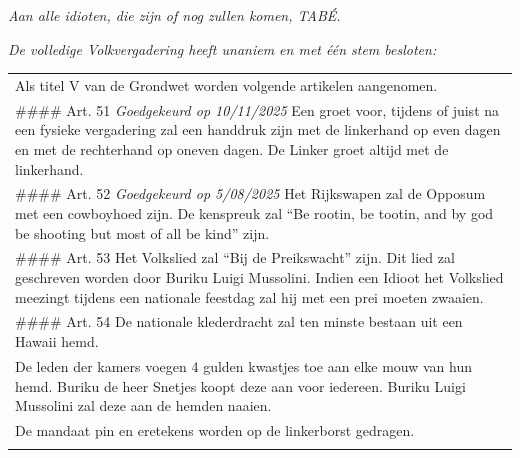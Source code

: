 \emph{Aan alle idioten, die zijn of nog zullen komen, TABÉ.}

\emph{De volledige Volkvergadering heeft unaniem en met één stem
besloten:}

\begin{longtable}[]{@{}l@{}}
\toprule
\endhead
\begin{minipage}[t]{0.36\columnwidth}\raggedright
Als titel V van de Grondwet worden volgende artikelen aangenomen.\strut
\end{minipage}\tabularnewline
\begin{minipage}[t]{0.36\columnwidth}\raggedright
\#\#\#\# Art. 51 \emph{Goedgekeurd op 10/11/2025} Een groet voor,
tijdens of juist na een fysieke vergadering zal een handdruk zijn met de
linkerhand op even dagen en met de rechterhand op oneven dagen. De
Linker groet altijd met de linkerhand.\strut
\end{minipage}\tabularnewline
\begin{minipage}[t]{0.36\columnwidth}\raggedright
\#\#\#\# Art. 52 \emph{Goedgekeurd op 5/08/2025} Het Rijkswapen zal de
Opposum met een cowboyhoed zijn. De kenspreuk zal ``Be rootin, be
tootin, and by god be shooting but most of all be kind'' zijn.\strut
\end{minipage}\tabularnewline
\begin{minipage}[t]{0.36\columnwidth}\raggedright
\#\#\#\# Art. 53 Het Volkslied zal ``Bij de Preikswacht'' zijn. Dit lied
zal geschreven worden door Buriku Luigi Mussolini. Indien een Idioot het
Volkslied meezingt tijdens een nationale feestdag zal hij met een prei
moeten zwaaien.\strut
\end{minipage}\tabularnewline
\begin{minipage}[t]{0.36\columnwidth}\raggedright
\#\#\#\# Art. 54 De nationale klederdracht zal ten minste bestaan uit
een Hawaii hemd.\strut
\end{minipage}\tabularnewline
\begin{minipage}[t]{0.36\columnwidth}\raggedright
De leden der kamers voegen 4 gulden kwastjes toe aan elke mouw van hun
hemd. Buriku de heer Snetjes koopt deze aan voor iedereen. Buriku Luigi
Mussolini zal deze aan de hemden naaien.\strut
\end{minipage}\tabularnewline
\begin{minipage}[t]{0.36\columnwidth}\raggedright
De mandaat pin en eretekens worden op de linkerborst gedragen.\strut
\end{minipage}\tabularnewline
\begin{minipage}[t]{0.36\columnwidth}\raggedright

\end{minipage}
\end{longtable}
